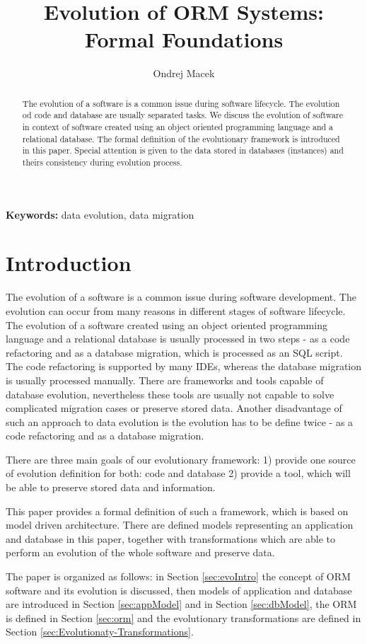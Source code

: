 \documentclass[11pt]{article}
\title{Evolution of ORM Systems: Formal Foundations}
\author{Ondrej Macek}
\begin{document}
\maketitle
\begin{abstract}
The evolution of a software is a common issue during software lifecycle. The evolution od code and database are usually separated tasks. We discuss the evolution of software in context of  software created using an object oriented programming language and a relational database. The formal definition of the evolutionary framework is introduced in this paper. Special attention is given to the data stored in databases (instances) and theirs consistency during evolution process.
\end{abstract}

\textbf{Keywords:} data evolution, data migration
\section{Introduction}
The evolution of a software is a common issue during software development. The evolution can occur from many reasons in different stages of software lifecycle. The evolution of a software created using an object oriented programming language and a relational database is usually processed in two steps - as a code refactoring and as a database migration, which is processed as an SQL script. The code refactoring is supported by many IDEs, whereas the database migration is usually processed manually. There are frameworks and tools capable of database evolution, nevertheless these tools are usually not capable to solve complicated migration cases or preserve stored data. Another disadvantage of such an approach to data evolution is the evolution has to be define twice - as a code refactoring and as a database migration.

There are three main goals of our evolutionary framework: 1) provide one source of evolution definition for both: code and database 2) provide a tool, which will be able to preserve stored data and information.

This paper provides a formal definition of such a framework, which is based on model driven architecture. There are defined models representing an application and database in this paper, together with transformations which are able to perform an evolution of the whole software and preserve data.



The paper is organized as follows: in Section \ref{sec:evoIntro} the concept of ORM software and its evolution is discussed, then models of application and database are introduced in Section \ref{sec:appModel} and in Section \ref{sec:dbModel}, the ORM is defined in Section \ref{sec:orm} and the evolutionary transformations are defined in Section \ref{sec:Evolutionaty-Transformations}.
\end{document}

